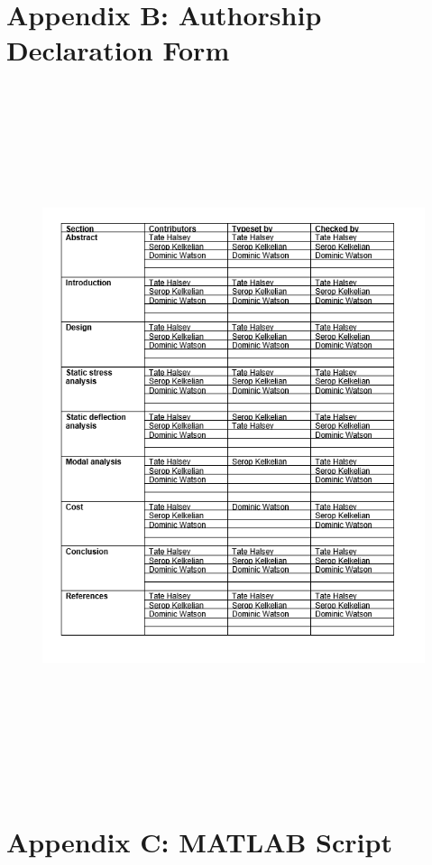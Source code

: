 \documentclass[12pt]{article}
\begin{document}
\section{Appendix B: Authorship Declaration Form} 
\begin{figure}[H]
\centering
\includegraphics[height= 20.5cm, width= 18.5cm]{Appendix_B.png}
\end{figure}
\newpage

\section{Appendix C: MATLAB Script}

\newpage
\end{document}
